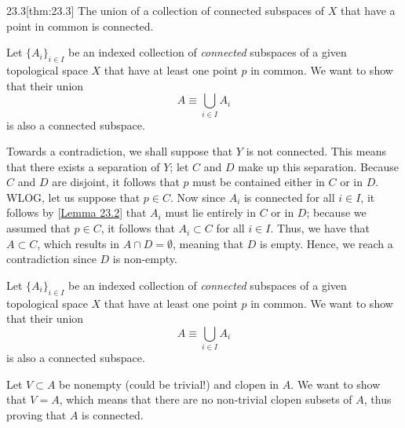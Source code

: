 \begin{thmBox}{23.3}[thm:23.3]
    The union of a collection of connected subspaces of \( X \) that have a 
    point in common is connected.

    \baseRule

    \begin{proofBox}
        Let \( \{ A_{ i } \}_{ i \in I } \) be an indexed collection of 
        \textit{connected} subspaces of a given topological space \( X \) that
        have at least one point \( p \) in common.
        We want to show that their union 
        \begin{equation*}
            A \equiv \bigcup_{ i \in I } A_{ i }
        \end{equation*}
        is also a connected subspace.

        \baseSkip 

        Towards a contradiction, we shall suppose that \( Y \) is not connected.
        This means that there exists a separation of \( Y \); let \( C \) and 
        \( D \) make up this separation.
        Because \( C \) and \( D \) are disjoint, it follows that \( p \) must
        be contained either in \( C \) or in \( D \).
        WLOG, let us suppose that \( p \in C \).
        Now since \( A_{ i } \) is connected for all \( i \in I \), it follows
        by [\hyperlink{lem:23.3}{Lemma 23.2}] that \( A_{ i } \) must lie
        entirely in \( C \) or in \( D \); because we assumed that 
        \( p \in C \), it follows that  \( A_{ i } \subset C \) for all
        \( i \in I \).
        Thus, we have that \( A \subset C \), which results in 
        \( A \cap D = \emptyset \), meaning that \( D \) is empty.
        Hence, we reach a contradiction since \( D \) is non-empty.

        \baseRule 

        Let \( \{ A_{ i } \}_{ i \in I } \) be an indexed collection of 
        \textit{connected} subspaces of a given topological space \( X \) that
        have at least one point \( p \) in common.
        We want to show that their union 
        \begin{equation*}
            A \equiv \bigcup_{ i \in I } A_{ i }
        \end{equation*}
        is also a connected subspace.

        \baseSkip

        Let \( V \subset A \) be nonempty (could be trivial!) and clopen in
        \( A \).
        We want to show that \( V = A \), which means that there are no 
        non-trivial clopen subsets of \( A \), thus proving that \( A \) is 
        connected.


\end{proofBox}
\end{thmBox}
